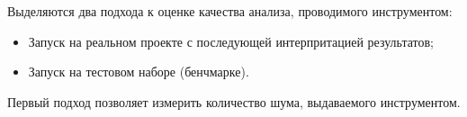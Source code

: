 Выделяются два подхода к оценке качества анализа, проводимого инструментом:
\begin{itemize}
    \item Запуск на реальном проекте с последующей интерпритацией результатов;
    \item Запуск на тестовом наборе (бенчмарке).
\end{itemize}

Первый подход позволяет измерить количество шума, выдаваемого инструментом.




\FloatBarrier
